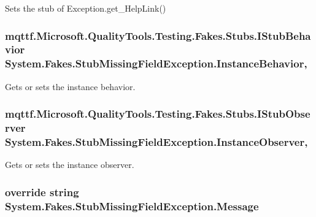Sets the stub of Exception.\-get\-\_\-\-Help\-Link()

\hypertarget{class_system_1_1_fakes_1_1_stub_missing_field_exception_a034a7abfe9245f2df8e4569096833f26}{
\subsubsection[{Instance\-Behavior}]{\setlength{\rightskip}{0pt plus 5cm}mqttf.\-Microsoft.\-Quality\-Tools.\-Testing.\-Fakes.\-Stubs.\-I\-Stub\-Behavior System.\-Fakes.\-Stub\-Missing\-Field\-Exception.\-Instance\-Behavior\hspace{0.3cm}{\ttfamily [get]}, {\ttfamily [set]}}}\label{class_system_1_1_fakes_1_1_stub_missing_field_exception_a034a7abfe9245f2df8e4569096833f26}


Gets or sets the instance behavior.

\hypertarget{class_system_1_1_fakes_1_1_stub_missing_field_exception_a2ffeaae2f3c2f9e96d122f2d7eef6c58}{
\subsubsection[{Instance\-Observer}]{\setlength{\rightskip}{0pt plus 5cm}mqttf.\-Microsoft.\-Quality\-Tools.\-Testing.\-Fakes.\-Stubs.\-I\-Stub\-Observer System.\-Fakes.\-Stub\-Missing\-Field\-Exception.\-Instance\-Observer\hspace{0.3cm}{\ttfamily [get]}, {\ttfamily [set]}}}\label{class_system_1_1_fakes_1_1_stub_missing_field_exception_a2ffeaae2f3c2f9e96d122f2d7eef6c58}


Gets or sets the instance observer.

\hypertarget{class_system_1_1_fakes_1_1_stub_missing_field_exception_ac3acaf09894615322e7cd303de1b55f3}{
\subsubsection[{Message}]{\setlength{\rightskip}{0pt plus 5cm}override string System.\-Fakes.\-Stub\-Missing\-Field\-Exception.\-Message\hspace{0.3cm}{\ttfamily [get]}}}\label{class_system_1_1_fakes_1_1_stub_missing_field_exception_ac3acaf09894615322e7cd303de1b55f3}


